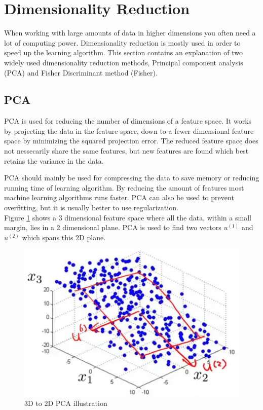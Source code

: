 
\section{Dimensionality Reduction}
When working with large amounts of data in higher dimensions you often need a lot of computing power. Dimensionality reduction is mostly used in order to speed up the learning algorithm. This section contains an explanation of two widely used dimensionality reduction methods, Principal component analysis (PCA) and Fisher Discriminant method (Fisher).


\subsection{PCA}

PCA is used for reducing the number of dimensions of a feature space.
It works by projecting the data in the feature space, down to a fewer dimensional feature space by minimizing the squared projection error.
The reduced feature space does not nessecarily share the same features, but new features are found which best retains the variance in the data.

PCA should mainly be used for compressing the data to save memory or reducing running time of learning algorithm.
By reducing the amount of features most machine learning algorithms runs faster.
PCA can also be used to prevent overfitting, but it is usually better to use regularization. \\

Figure \ref{fig:pca} shows a 3 dimensional feature space where all the data, within a small margin, lies in a 2 dimensional plane.
PCA is used to find two vectors $u^{(1)}$ and $u^{(2)}$ which spans this 2D plane.

\begin{figure}[H]
\centering
\includegraphics{billeder/pca}
\caption{3D to 2D PCA illustration}
\label{fig:pca}
\end{figure}

